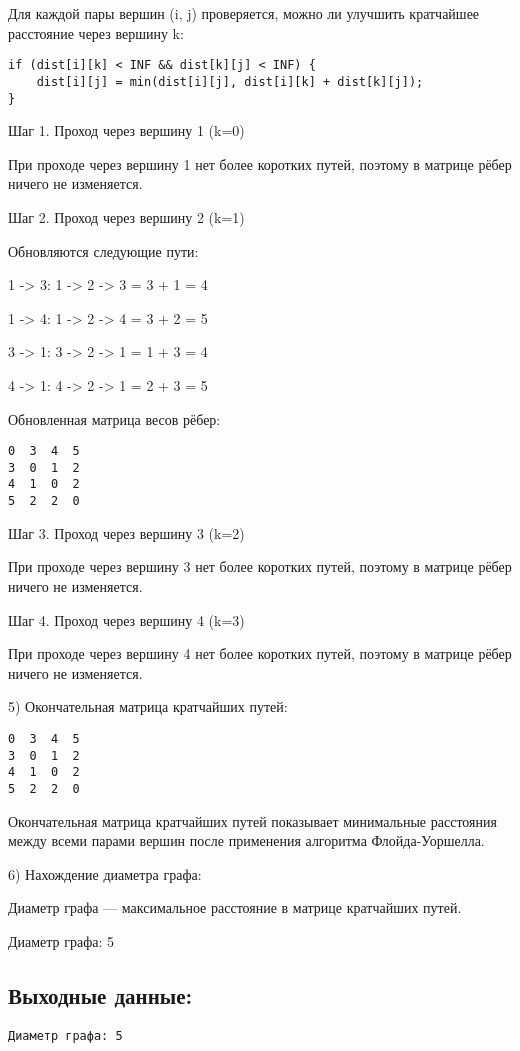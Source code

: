 \documentclass[12pt]{article}
\begin{document}
Для каждой пары вершин (i, j) проверяется, можно ли улучшить кратчайшее расстояние через вершину k:
\begin{verbatim}
if (dist[i][k] < INF && dist[k][j] < INF) {
    dist[i][j] = min(dist[i][j], dist[i][k] + dist[k][j]);
}
\end{verbatim}

Шаг 1. Проход через вершину 1 (k=0)

При проходе через вершину 1 нет более коротких путей, поэтому в матрице рёбер ничего не изменяется.

Шаг 2. Проход через вершину 2 (k=1)

Обновляются следующие пути: 

1 -> 3: 1 -> 2 -> 3 = 3 + 1 = 4

1 -> 4: 1 -> 2 -> 4 = 3 + 2 = 5

3 -> 1: 3 -> 2 -> 1 = 1 + 3 = 4

4 -> 1: 4 -> 2 -> 1 = 2 + 3 = 5

Обновленная матрица весов рёбер:
\begin{verbatim}
0  3  4  5
3  0  1  2
4  1  0  2
5  2  2  0
\end{verbatim}

Шаг 3. Проход через вершину 3 (k=2)

При проходе через вершину 3 нет более коротких путей, поэтому в матрице рёбер ничего не изменяется.

Шаг 4. Проход через вершину 4 (k=3)

При проходе через вершину 4 нет более коротких путей, поэтому в матрице рёбер ничего не изменяется.

5) Окончательная матрица кратчайших путей:
\begin{verbatim}
0  3  4  5
3  0  1  2
4  1  0  2
5  2  2  0
\end{verbatim}

Окончательная матрица кратчайших путей показывает минимальные расстояния между всеми парами вершин после применения алгоритма Флойда-Уоршелла.

6) Нахождение диаметра графа:

Диаметр графа — максимальное расстояние в матрице кратчайших путей.

Диаметр графа: 5

\subsection{Выходные данные:}

\begin{verbatim}
Диаметр графа: 5
\end{verbatim}
\end{document}
